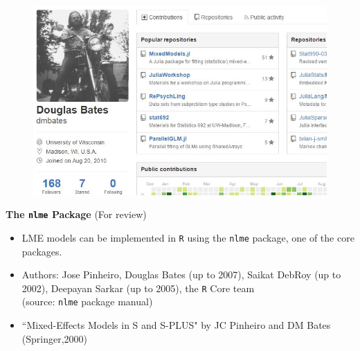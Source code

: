 \documentclass[compress]{beamer}        %
\makeatletter
\newcommand{\tcb}{\textcolor{beamer@blendedblue}}
\makeatother
\begin{document}
\begin{frame}
	\begin{figure}
\centering
\includegraphics[width=1.1\linewidth]{images/dmbatesgithub}

\end{figure}

\end{frame}	

		\begin{frame}{\bf \tcb{The \texttt{nlme} Package}}
			(For review)
			\begin{itemize}
				\item LME models can be implemented in \texttt{R} using the \texttt{nlme} package, one of the core packages.\\
				\item Authors: Jose Pinheiro, Douglas Bates (up to 2007), Saikat
				DebRoy (up to 2002), Deepayan Sarkar (up to 2005), the \texttt{R} Core team \\(source: \texttt{nlme} package manual)\\
				\item ``Mixed-Effects Models in S and S-PLUS" by JC Pinheiro and DM Bates (Springer,2000)
				
			\end{itemize}
			
		\end{frame}
\end{document}
